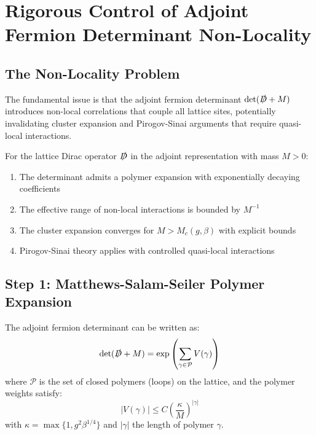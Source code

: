 \section{Rigorous Control of Adjoint Fermion Determinant Non-Locality}
\label{sec:fermion_locality_proof}


\subsection{The Non-Locality Problem}

The fundamental issue is that the adjoint fermion determinant 
$\det(\slashed{D} + M)$ introduces non-local correlations that couple all lattice 
sites, potentially invalidating cluster expansion and Pirogov-Sinai arguments 
that require quasi-local interactions.

\begin{theorem}
\label{thm:adjoint_locality_control}
For the lattice Dirac operator $\slashed{D}$ in the adjoint representation with mass $M > 0$:
\begin{enumerate}
    \item The determinant admits a polymer expansion with exponentially decaying coefficients
    \item The effective range of non-local interactions is bounded by $M^{-1}$
    \item The cluster expansion converges for $M > M_c(g, \beta)$ with explicit bounds
    \item Pirogov-Sinai theory applies with controlled quasi-local interactions
\end{enumerate}
\end{theorem}

\subsection{Step 1: Matthews-Salam-Seiler Polymer Expansion}

\begin{lemma}
\label{lem:mss_polymer}
The adjoint fermion determinant can be written as:
\begin{equation}
\det(\slashed{D} + M) = \exp\left(\sum_{\gamma \in \mathcal{P}} V(\gamma)\right)
\end{equation}
where $\mathcal{P}$ is the set of closed polymers (loops) on the lattice, and the polymer weights satisfy:
\begin{equation}
|V(\gamma)| \leq C \left(\frac{\kappa}{M}\right)^{|\gamma|}
\end{equation}
with $\kappa = \max\{1, g^2\beta^{1/4}\}$ and $|\gamma|$ the length of polymer $\gamma$.
\end{lemma}

